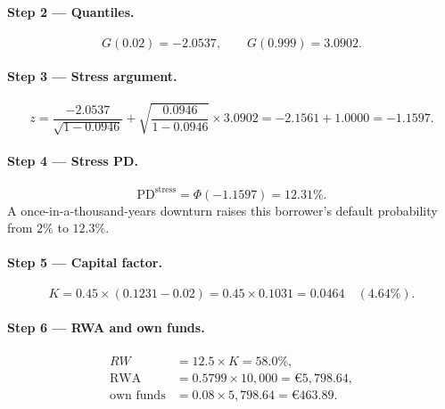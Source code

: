 \documentclass[11pt,a4paper]{report}
\renewcommand{\EUR}[1]{\euro#1}
\theoremstyle{definition}
\theoremstyle{plain}
\newcommand{\PD}{\mathrm{PD}}
\newcommand{\RWA}{\mathrm{RWA}}
\begin{document}
\paragraph{Step 2 --- Quantiles.}
\begin{equation}
  G(0.02)=-2.0537,\qquad G(0.999)=3.0902 .
\end{equation}

\paragraph{Step 3 --- Stress argument.}
\begin{equation}
  z=\frac{-2.0537}{\sqrt{1-0.0946}}
     +\sqrt{\frac{0.0946}{1-0.0946}}\times 3.0902
    =-2.1561+1.0000=-1.1597 .
\end{equation}

\paragraph{Step 4 --- Stress PD.}
\begin{equation}
  \PD^{\text{stress}}=\Phi(-1.1597)=12.31\% .
\end{equation}
A once-in-a-thousand-years downturn raises this borrower's default
probability from $2\%$ to $12.3\%$.

\paragraph{Step 5 --- Capital factor.}
\begin{equation}
  K=0.45\times(0.1231-0.02)=0.45\times 0.1031=0.0464\quad(4.64\%).
\end{equation}

\paragraph{Step 6 --- RWA and own funds.}
\begin{align}
  RW &= 12.5\times K = 58.0\%,\\
  \RWA &= 0.5799\times 10{,}000 = \EUR{5{,}798.64},\\
  \text{own funds} &= 0.08\times 5{,}798.64=\EUR{463.89}.
\end{align}
\end{document}

